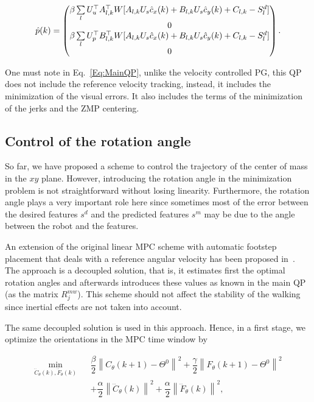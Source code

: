 \begin{equation*}
 \hat{p}(k) = 
 \left(
 \begin{matrix}
 \beta  \sum\limits_l U_{u}^{\top} A_{l,k}^{\top} W [A_{l,k} U_{s} \hat{c}_x(k) + B_{l,k} U_{s} \hat{c}_y(k) + C_{l,k} - S^d_l]\\
 0 \\
 \beta  \sum\limits_l U_{p}^{\top} B_{l,k}^{\top} W [A_{l,k} U_{s} \hat{c}_x(k) + B_{l,k} U_{s} \hat{c}_y(k) + C_{l,k} - S^d_l ]\\
 0
 \end{matrix}
 \right).
\end{equation*}

One must note in Eq.~\ref{Eq:MainQP}, unlike the velocity controlled PG, this QP does not include the reference velocity tracking, instead, it includes the minimization of the visual errors. It also includes the terms of the minimization of the jerks and the ZMP centering.

\subsection{Control of the rotation angle}
\label{subsection:control_of_the_rotation_angle}

So far, we have proposed a scheme to control the trajectory of the center of mass in the $xy$ plane. However, introducing the rotation angle in the minimization problem is not straightforward without losing linearity. Furthermore, the rotation angle plays a very important role here since sometimes most of the error between the desired features $s^d$ and the predicted features $s^m$ may be due to the angle between the robot and the features.

An extension of the original linear MPC scheme with automatic footstep placement that deals with a reference angular velocity has been proposed in~\citep{HerdtIROS2010}. The approach is a decoupled solution, that is, it estimates first the optimal rotation angles and afterwards introduces these values as known in the main QP (as the matrix ${R^{mw}_{j}}$). This scheme should not affect the stability of the walking since inertial effects are not taken into account.

The same decoupled solution is used in this approach. Hence, in a first stage, we optimize the orientations in the MPC time window by  

{\small
\begin{eqnarray}
 \min\limits_{\dddot{C}_{\theta}(k),\dddot{F}_{\theta}(k) }  &&  \dfrac{\beta}{2} \left\| C_{\theta}(k+1) - \Theta^{0} \right\|^2 + \dfrac{\gamma}{2} \left\| F_{\theta}(k+1) - \Theta^{0} \right\|^2 \\
\nonumber && + \dfrac{\alpha}{2} \left\| \dddot{C}_{\theta}(k) \right\|^2 + \dfrac{\alpha}{2} \left\| \dddot{F}_{\theta}(k) \right\|^2,
\end{eqnarray}
}

